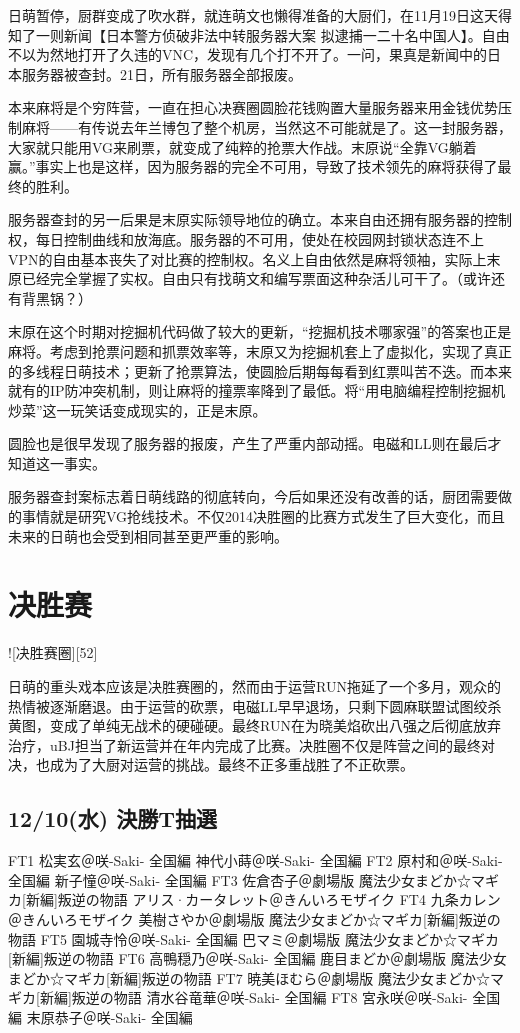 日萌暂停，厨群变成了吹水群，就连萌文也懒得准备的大厨们，在11月19日这天得知了一则新闻【日本警方侦破非法中转服务器大案 拟逮捕一二十名中国人】。自由不以为然地打开了久违的VNC，发现有几个打不开了。一问，果真是新闻中的日本服务器被查封。21日，所有服务器全部报废。

本来麻将是个穷阵营，一直在担心决赛圈圆脸花钱购置大量服务器来用金钱优势压制麻将——有传说去年兰博包了整个机房，当然这不可能就是了。这一封服务器，大家就只能用VG来刷票，就变成了纯粹的抢票大作战。末原说“全靠VG躺着赢。”事实上也是这样，因为服务器的完全不可用，导致了技术领先的麻将获得了最终的胜利。

服务器查封的另一后果是末原实际领导地位的确立。本来自由还拥有服务器的控制权，每日控制曲线和放海底。服务器的不可用，使处在校园网封锁状态连不上VPN的自由基本丧失了对比赛的控制权。名义上自由依然是麻将领袖，实际上末原已经完全掌握了实权。自由只有找萌文和编写票面这种杂活儿可干了。（或许还有背黑锅？）

末原在这个时期对挖掘机代码做了较大的更新，“挖掘机技术哪家强”的答案也正是麻将。考虑到抢票问题和抓票效率等，末原又为挖掘机套上了虚拟化，实现了真正的多线程日萌技术；更新了抢票算法，使圆脸后期每每看到红票叫苦不迭。而本来就有的IP防冲突机制，则让麻将的撞票率降到了最低。将“用电脑编程控制挖掘机炒菜”这一玩笑话变成现实的，正是末原。

圆脸也是很早发现了服务器的报废，产生了严重内部动摇。电磁和LL则在最后才知道这一事实。

服务器查封案标志着日萌线路的彻底转向，今后如果还没有改善的话，厨团需要做的事情就是研究VG抢线技术。不仅2014决胜圈的比赛方式发生了巨大变化，而且未来的日萌也会受到相同甚至更严重的影响。

\chapter{决胜赛}

![决胜赛圈][52]

日萌的重头戏本应该是决胜赛圈的，然而由于运营RUN拖延了一个多月，观众的热情被逐渐磨退。由于运营的砍票，电磁LL早早退场，只剩下圆麻联盟试图绞杀黄图，变成了单纯无战术的硬碰硬。最终RUN在为晓美焰砍出八强之后彻底放弃治疗，uBJ担当了新运营并在年内完成了比赛。决胜圈不仅是阵营之间的最终对决，也成为了大厨对运营的挑战。最终不正多重战胜了不正砍票。

\section{12/10(水) 決勝T抽選}

    FT1 松実玄＠咲-Saki- 全国編 神代小蒔＠咲-Saki- 全国編
    FT2 原村和＠咲-Saki- 全国編  新子憧＠咲-Saki- 全国編
    FT3 佐倉杏子＠劇場版 魔法少女まどか☆マギカ[新編]叛逆の物語  アリス·カータレット＠きんいろモザイク
    FT4 九条カレン＠きんいろモザイク  美樹さやか＠劇場版 魔法少女まどか☆マギカ[新編]叛逆の物語
    FT5 園城寺怜＠咲-Saki- 全国編  巴マミ＠劇場版 魔法少女まどか☆マギカ[新編]叛逆の物語
    FT6 高鴨穏乃＠咲-Saki- 全国編  鹿目まどか＠劇場版 魔法少女まどか☆マギカ[新編]叛逆の物語
    FT7 暁美ほむら＠劇場版 魔法少女まどか☆マギカ[新編]叛逆の物語  清水谷竜華＠咲-Saki- 全国編
    FT8 宮永咲＠咲-Saki- 全国編  末原恭子＠咲-Saki- 全国編

